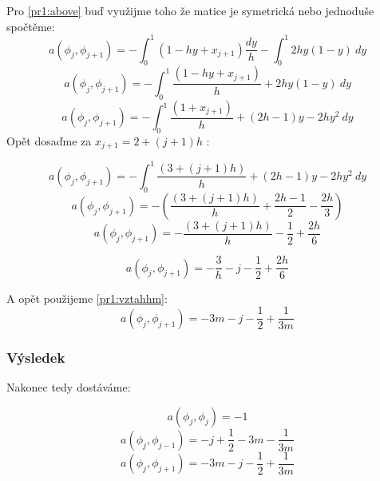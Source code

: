 \documentclass[../main.tex]{subfiles}
\begin{document}
Pro \eqref{pr1:above} buď využijme toho že matice je symetrická nebo jednoduše spočtěme:
\begin{equation}
    a(\phi_j, \phi_{j+1}) = - \int_0^1 (1 -hy + x_{j+1}) \frac{dy}{h} - \int_0^1 2h y(1-y) \ dy
\end{equation}
\begin{equation}
    a(\phi_j, \phi_{j+1}) = - \int_0^1 \frac{(1 -hy + x_{j+1}) }{h} + 2h y(1-y) \ dy
\end{equation}
\begin{equation}
    a(\phi_j, \phi_{j+1}) = - \int_0^1 \frac{(1 + x_{j+1}) }{h} +(2h - 1)y - 2hy^2 \ dy
\end{equation}
Opět dosaďme za $x_{j+1} = 2 + (j+1)h$ : 

\begin{equation}
    a(\phi_j, \phi_{j+1}) = - \int_0^1 \frac{(3 + (j+1)h) }{h} + (2h - 1)y - 2hy^2 \ dy
\end{equation}
\begin{equation}
    a(\phi_j, \phi_{j+1}) = - \left( \frac{(3 + (j+1)h) }{h} + \frac{2h - 1}{2} - \frac{2h}{3}\right)
\end{equation}
\begin{equation}
    a(\phi_j, \phi_{j+1}) = - \frac{(3 + (j+1)h) }{h} - \frac{1}{2} + \frac{2h}{6} 
\end{equation}

\begin{equation}
    a(\phi_j, \phi_{j+1}) = - \frac{3}{h} - j - \frac{1}{2} + \frac{2h}{6} 
\end{equation}


A opět použijeme \eqref{pr1:vztahhm}:
\begin{equation}
    a(\phi_j, \phi_{j+1}) = - 3m - j - \frac{1}{2} + \frac{1}{3m} 
\end{equation}

\subsubsection{Výsledek}
Nakonec tedy dostáváme:

\begin{equation}
    a(\phi_j, \phi_j) = -1
\end{equation}
\begin{equation}
    a(\phi_j, \phi_{j-1}) = -j + \frac{1}{2} -3m -\frac{1}{3m}
\end{equation}
\begin{equation}
    a(\phi_j, \phi_{j+1}) = - 3m - j - \frac{1}{2} + \frac{1}{3m} 
\end{equation}
\end{document}
